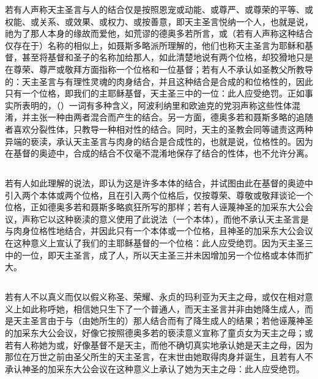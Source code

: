 若有人声称天主圣言与人的结合仅是按照恩宠或动能、或尊严、或尊荣的平等、或权能、或关系、或效果、或权力、或按善意，即天主圣言悦纳一个人，也就是说，祂为了那人本身的缘故而爱他，如荒谬的德奥多若所言，或（若有人声称这种结合仅存在于）名称的相似上，如聂斯多略派所理解的，他们也称天主圣言为耶稣和基督，甚至将基督和圣子的名称加给那人，如此清楚地说有两个位格，却狡猾地只是在尊荣、尊严或敬拜方面指称一个位格和一位基督；若有人不承认如圣教父所教导的：天主圣言与有理性灵魂的肉身结合，并且这种结合是合成的和位格性的，因此只有一个位格，即我们的主耶稣基督，天主圣三中的一位：此人应受绝罚。正如事实所表明的，（）一词有多种含义，阿波利纳里和欧迪克的党羽声称这些性体混淆，并主张一种由两者混合而产生的结合。另一方面，德奥多若和聂斯多略的追随者喜欢分裂性体，只教导一种相对性的结合。同时，天主的圣教会同等谴责这两种异端的亵渎，承认天主圣言与肉身的结合是合成性的，也就是说，位格性的。因为在基督的奥迹中，合成的结合不仅毫不混淆地保存了结合的性体，也不允许分离。\par


\subsection{}

若有人如此理解的说法，即认为这是许多本体的结合，并试图由此在基督的奥迹中引入两个本体或两个位格，且在引入两个位格后，仅按尊荣、尊敬或敬拜谈论一个位格，正如德奥多若和聂斯多略疯狂所写的那样；若有人诬蔑神圣的加采东大公会议，声称它以这种亵渎的意义使用了此说法（一个本体），而他不承认天主圣言是与肉身位格性地结合，并因此只有一个本体或一个位格，且神圣的加采东大公会议在这种意义上宣认了我们的主耶稣基督的一个位格：此人应受绝罚。因为天主圣三中的一位，即天主圣言，成了人，所以天主圣三并未因增加另一个位格或本体而扩大。\par


\subsection{}

若有人不以真义而仅以假义称圣、荣耀、永贞的玛利亚为天主之母，或仅在相对意义上如此称呼她，相信她只生下了一个普通人，而天主圣言并非由她降生成人，而是天主圣言由于与（由她所生的）那人结合而有了降生成人的结果；若他诬蔑神圣的加采东大公会议，好像它按照德奥多若的亵渎意义宣称了童贞女为天主之母；或若有人称她为或，好像基督不是天主，而他不确切真实地承认她是天主之母，因为那位在万世之前由圣父所生的天主圣言，在末世由她取得肉身并诞生，且若有人不承认神圣的加采东大公会议在这种意义上承认了她为天主之母：此人应受绝罚。\par

